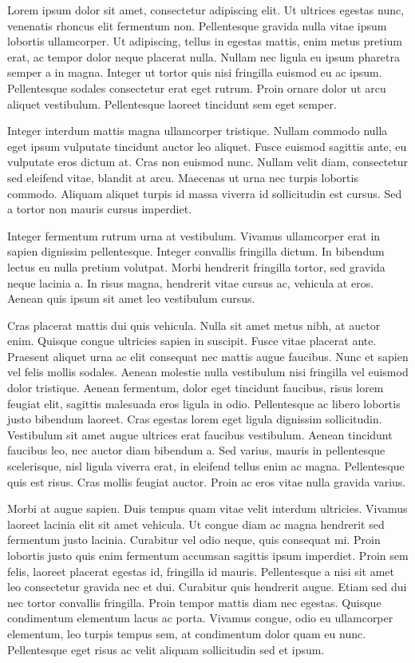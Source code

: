 Lorem ipsum dolor sit amet, consectetur adipiscing elit. Ut ultrices egestas nunc, venenatis rhoncus elit fermentum non. Pellentesque gravida nulla vitae ipsum lobortis ullamcorper. Ut adipiscing, tellus in egestas mattis, enim metus pretium erat, ac tempor dolor neque placerat nulla. Nullam nec ligula eu ipsum pharetra semper a in magna. Integer ut tortor quis nisi fringilla euismod eu ac ipsum. Pellentesque sodales consectetur erat eget rutrum. Proin ornare dolor ut arcu aliquet vestibulum. Pellentesque laoreet tincidunt sem eget semper.

Integer interdum mattis magna ullamcorper tristique. Nullam commodo nulla eget ipsum vulputate tincidunt auctor leo aliquet. Fusce euismod sagittis ante, eu vulputate eros dictum at. Cras non euismod nunc. Nullam velit diam, consectetur sed eleifend vitae, blandit at arcu. Maecenas ut urna nec turpis lobortis commodo. Aliquam aliquet turpis id massa viverra id sollicitudin est cursus. Sed a tortor non mauris cursus imperdiet.

Integer fermentum rutrum urna at vestibulum. Vivamus ullamcorper erat in sapien dignissim pellentesque. Integer convallis fringilla dictum. In bibendum lectus eu nulla pretium volutpat. Morbi hendrerit fringilla tortor, sed gravida neque lacinia a. In risus magna, hendrerit vitae cursus ac, vehicula at eros. Aenean quis ipsum sit amet leo vestibulum cursus.

Cras placerat mattis dui quis vehicula. Nulla sit amet metus nibh, at auctor enim. Quisque congue ultricies sapien in suscipit. Fusce vitae placerat ante. Praesent aliquet urna ac elit consequat nec mattis augue faucibus. Nunc et sapien vel felis mollis sodales. Aenean molestie nulla vestibulum nisi fringilla vel euismod dolor tristique. Aenean fermentum, dolor eget tincidunt faucibus, risus lorem feugiat elit, sagittis malesuada eros ligula in odio. Pellentesque ac libero lobortis justo bibendum laoreet. Cras egestas lorem eget ligula dignissim sollicitudin. Vestibulum sit amet augue ultrices erat faucibus vestibulum. Aenean tincidunt faucibus leo, nec auctor diam bibendum a. Sed varius, mauris in pellentesque scelerisque, nisl ligula viverra erat, in eleifend tellus enim ac magna. Pellentesque quis est risus. Cras mollis feugiat auctor. Proin ac eros vitae nulla gravida varius.

Morbi at augue sapien. Duis tempus quam vitae velit interdum ultricies. Vivamus laoreet lacinia elit sit amet vehicula. Ut congue diam ac magna hendrerit sed fermentum justo lacinia. Curabitur vel odio neque, quis consequat mi. Proin lobortis justo quis enim fermentum accumsan sagittis ipsum imperdiet. Proin sem felis, laoreet placerat egestas id, fringilla id mauris. Pellentesque a nisi sit amet leo consectetur gravida nec et dui. Curabitur quis hendrerit augue. Etiam sed dui nec tortor convallis fringilla. Proin tempor mattis diam nec egestas. Quisque condimentum elementum lacus ac porta. Vivamus congue, odio eu ullamcorper elementum, leo turpis tempus sem, at condimentum dolor quam eu nunc. Pellentesque eget risus ac velit aliquam sollicitudin sed et ipsum. 




